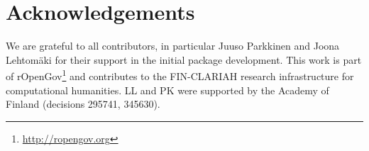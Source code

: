 \section{Acknowledgements}

We are grateful to all contributors, in particular Juuso Parkkinen and Joona Lehtomäki for their support in the initial package development. This work is part of rOpenGov\footnote{\url{http://ropengov.org}} and contributes to the FIN-CLARIAH research infrastructure for computational humanities. LL and PK were supported by the Academy of Finland (decisions 295741, 345630).



\address{Pyry Kantanen\\
  Department of Computing\\
  PO Box 20014 University of Turku\\
  Finland\\
  ORCiD: 0000-0003-2853-2765\\
  }

\address{Erik Bülow\\
  Department of Orthopaedics, Institute of Clinical Sciences\\
  Sahlgrenska Academy at University of Gothenburg\\
  Sweden\\
  ORCiD: 0000-0002-9973-456X\\
  }
  
\address{Måns Magnusson\\
  Department of Statistics\\
  Uppsala University\\
  Sweden\\
  ORCiD: 0000-0002-0296-2719\\
  }
  
\address{Jussi Paananen\\
  Institute of Biomedicine\\
  University of Eastern Finland\\
  Finland\\
  ORCiD: 0000-0001-5100-4907\\
  }

\address{Leo Lahti\\
  Department of Computing\\
  PO Box 20014 University of Turku\\
  Finland\\
  ORCiD: 0000-0001-5537-637X\\
  }
